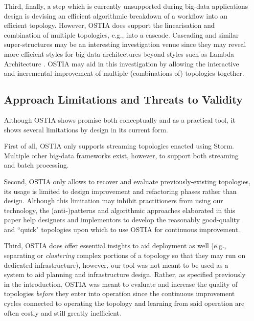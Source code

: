 Third, finally, a step which is currently unsupported during big-data applications design is devising an efficient algorithmic breakdown of a workflow into an efficient topology. However, OSTIA does support the linearisation and combination of multiple topologies, e.g., into a cascade. Cascading and similar super-structures may be an interesting investigation venue since they may reveal more efficient styles for big-data architectures beyond styles such as Lambda Architecture \cite{lambda}. OSTIA may aid in this investigation by allowing the interactive and incremental improvement of multiple (combinations of) topologies together.

\subsection{Approach Limitations and Threats to Validity}\label{lim}

Although OSTIA shows promise both conceptually and as a practical tool, it shows several limitations by design in its current form.

First of all, OSTIA only supports streaming topologies enacted using Storm. Multiple other big-data frameworks exist, however, to support both streaming and batch processing. 

Second, OSTIA only allows to recover and evaluate previously-existing topologies, its usage is limited to design improvement and refactoring phases rather than design. Although this limitation may inhibit practitioners from using our technology, the (anti-)patterns and algorithmic approaches elaborated in this paper help designers and implementors to develop the reasonably good-quality and ``quick" topologies upon which to use OSTIA for continuous improvement.

Third, OSTIA does offer essential insights to aid deployment as well (e.g., separating or \emph{clustering} complex portions of a topology so that they may run on dedicated infrastructure), however, our tool was not meant to be used as a system to aid planning and infrastructure design. Rather, as specified previously in the introduction, OSTIA was meant to evaluate and increase the quality of topologies \emph{before} they enter into operation since the continuous improvement cycles connected to operating the topology and learning from said operation are often costly and still greatly inefficient.


